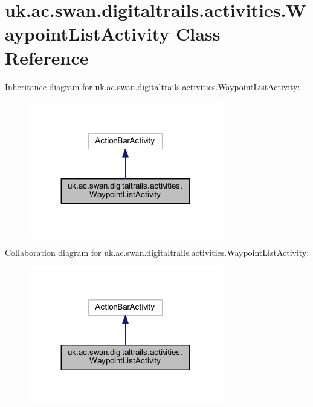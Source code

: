 \hypertarget{classuk_1_1ac_1_1swan_1_1digitaltrails_1_1activities_1_1_waypoint_list_activity}{\section{uk.\+ac.\+swan.\+digitaltrails.\+activities.\+Waypoint\+List\+Activity Class Reference}
\label{classuk_1_1ac_1_1swan_1_1digitaltrails_1_1activities_1_1_waypoint_list_activity}
}


Inheritance diagram for uk.\+ac.\+swan.\+digitaltrails.\+activities.\+Waypoint\+List\+Activity\+:\nopagebreak
\begin{figure}[H]
\begin{center}
\leavevmode
\includegraphics[width=239pt]{classuk_1_1ac_1_1swan_1_1digitaltrails_1_1activities_1_1_waypoint_list_activity__inherit__graph}
\end{center}
\end{figure}


Collaboration diagram for uk.\+ac.\+swan.\+digitaltrails.\+activities.\+Waypoint\+List\+Activity\+:\nopagebreak
\begin{figure}[H]
\begin{center}
\leavevmode
\includegraphics[width=239pt]{classuk_1_1ac_1_1swan_1_1digitaltrails_1_1activities_1_1_waypoint_list_activity__coll__graph}
\end{center}
\end{figure}
